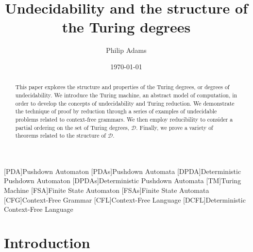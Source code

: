 \documentclass[psamsfonts]{amsart}
\title{Undecidability and the structure of the Turing degrees}
\author{Philip Adams}
\date{\today}
\theoremstyle{definition}
\theoremstyle{remark}
\numberwithin{equation}{section}
\begin{document}
\begin{abstract}

  This paper explores the structure and properties of the Turing degrees, or
  degrees of undecidability. We introduce the Turing machine, an abstract model
  of computation, in order to develop the concepts of undecidability and Turing
  reduction. We demonstrate the technique of proof by reduction through a series
  of examples of undecidable problems related to context-free grammars. We then
  employ reducibility to consider a partial ordering on the set of Turing degrees, $\mathcal{D}$. Finally, we prove a variety of theorems
  related to the structure of $\mathcal{D}$.
  
\end{abstract}

\maketitle


\tableofcontents
\begin{acronym}
  [PDA]{Pushdown Automaton}
  [PDAs]{Pushdown Automata}
  [DPDA]{Deterministic Pushdown Automaton}
  [DPDAs]{Deterministic Pushdown Automata}
  [TM]{Turing Machine}
  [FSA]{Finite State Automaton}
  [FSAs]{Finite State Automata}
  [CFG]{Context-Free Grammar}
  [CFL]{Context-Free Language}
  [DCFL]{Deterministic Context-Free Language}
\end{acronym}

\section{Introduction}
\end{document}

